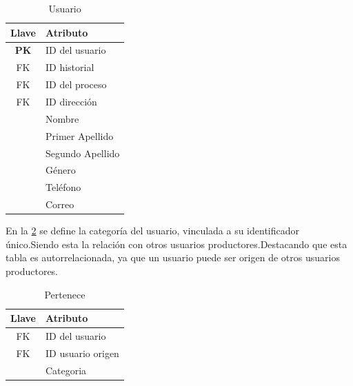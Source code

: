 \begin{table}[H]
    \centering
    \caption{Usuario} %
    \label{tab:norUsuario}
    \footnotesize %

    \begin{tabular}{|c|>{\raggedright\arraybackslash}p{2.5cm}|}
        \hline
        \textbf{Llave}       & \textbf{Atributo}   \\ \hline
        \textbf{PK} & ID del usuario  \\ \hline
        FK & ID historial       \\ \hline
        FK & ID del proceso         \\ \hline
        FK & ID dirección          \\ \hline
        & Nombre                   \\ \hline 
        & Primer Apellido          \\ \hline
        & Segundo Apellido         \\ \hline
        & Género                   \\ \hline
        & Teléfono                 \\ \hline
        & Correo                   \\ \hline
        
    \end{tabular}
\end{table}

En la \cref{tab:Categoría} se define la categoría del usuario, vinculada a su
identificador único.Siendo esta la relación con otros usuarios productores.Destacando
que esta tabla es autorrelacionada, ya que un usuario puede ser origen de otros usuarios
productores.

\begin{table}[H]
    \centering
    \caption{Pertenece} %
    \label{tab:Categoría}
    \footnotesize %

    \begin{tabular}{|c|>{\raggedright\arraybackslash}p{2.5cm}|}
        \hline
        \textbf{Llave}       & \textbf{Atributo}   \\ \hline
        FK & ID del usuario                         \\ \hline
        FK & ID usuario origen                      \\ \hline
           & Categoria                               \\ \hline
    \end{tabular}
\end{table}

